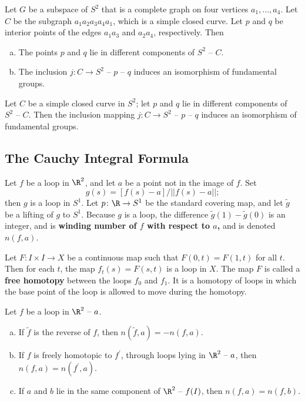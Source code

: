 \begin{lemma}
Let $G$ be a subspace of $S^2$ that is a complete graph on four vertices $a_1, \dots, a_4$. Let $C$ be the subgraph $a_1 a_2 a_3 a_4 a_1$, which is a simple closed curve. 
Let $p$ and $q$ be interior points of the edges $a_1 a_3$ and $a_2 a_4$, respectively. Then
\begin{enumerate}[a)]
    \item The points $p$ and $q$ lie in different components of $S^2 \text{ -- } C$. 
    \item The inclusion $j\colon C \rightarrow S^2 \text{ -- } p \text{ -- } q$ induces an isomorphism of fundamental groups.
\end{enumerate}
\end{lemma}

\begin{theorem}
Let $C$ be a simple closed curve in $S^2$; let $p$ and $q$ lie in different components of $S^2 \text{ -- } C$. Then the inclusion mapping
$j\colon C \rightarrow S^2 \text{ -- } p \text{ -- } q$ induces an isomorphism of fundamental groups.
\end{theorem}

\subsection{The Cauchy Integral Formula}

\begin{definition}
Let $f$ be a loop in $\R^2$, and let $a$ be a point not in the image of $f$. Set
\[
    g(s) = [f(s) - a]/||f(s) - a||;
\]
then $g$ is a loop in $S^1$. Let $p\colon \R \rightarrow S^1$ be the standard covering map, and let $\tilde{g}$ be a lifting of $g$ to $S^1$. 
Because $g$ is a loop, the difference $\tilde{g}(1) - \tilde{g}(0)$ is an integer, and is \textbf{winding number of $f$ with respect to $a$,} and is denoted $n(f, a)$.
\end{definition}

\begin{definition}
Let $F\colon I \times I \rightarrow X$ be a continuous map such that $F(0, t) = F(1, t)$ for all $t$. Then for each $t$, the map $f_t(s) = F(s, t)$ is a loop in $X$. 
The map $F$ is called a \textbf{free homotopy} between the loops $f_0$ and $f_1$. It is a homotopy of loops in which the base point of the loop
is allowed to move during the homotopy.
\end{definition}

\begin{lemma}
Let $f$ be a loop in $\R^2 \text{ -- } a$. 
\begin{enumerate}[a)]
    \item If $\tilde{f}$ is the reverse of $f$, then $n(\tilde{f}, a) = -n(f, a)$. 
    \item If $f$ is freely homotopic to $f^{\prime}$, through loops lying in $\R^2 \text{ -- } a$, then $n(f, a) = n(f^{\prime}, a)$.
    \item If $a$ and $b$ lie in the same component of $\R^2 \text{ -- } f(I)$, then $n(f, a) = n(f, b)$. 
\end{enumerate}
\end{lemma}


